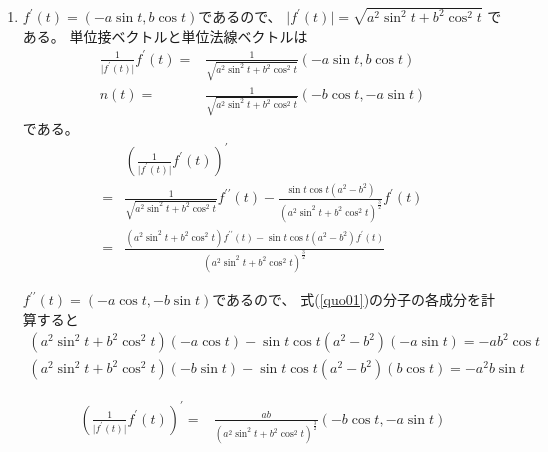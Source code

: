 \documentclass[12pt,b5paper]{ltjsarticle}
\begin{document}
\begin{enumerate}
\begin{enumerate}
\end{enumerate}

\dotfill

\begin{enumerate}
 \item
      $f^{\prime}(t)=(-a\sin t, b\cos t)$であるので、
      $\lvert f^{\prime}(t) \rvert = \sqrt{a^2\sin^2 t+b^2\cos^2 t}$
      である。
      単位接ベクトルと単位法線ベクトルは
      \begin{align}
       \frac{1}{\lvert f^{\prime}(t) \rvert}f^{\prime}(t)
        =& \frac{1}{\sqrt{a^2\sin^2 t+b^2\cos^2 t}} (-a\sin t, b\cos t)\\
       n(t) =& \frac{1}{\sqrt{a^2\sin^2 t+b^2\cos^2 t}} (-b\cos t , -a\sin t)
      \end{align}
      である。
      \begin{align}
       & \left( \frac{1}{\lvert f^{\prime}(t) \rvert}f^{\prime}(t) \right)^{\prime}\\
        =& \frac{1}{\sqrt{a^2\sin^2 t+b^2\cos^2 t}}f^{\prime\prime}(t)
       - \frac{\sin t \cos t (a^2-b^2)}{(a^2\sin^2 t+b^2\cos^2 t)^{\frac{3}{2}}}f^{\prime}(t)\\
        =& \frac{(a^2\sin^2 t+b^2\cos^2 t)f^{\prime\prime}(t)
       - \sin t \cos t (a^2-b^2)f^{\prime}(t)}{(a^2\sin^2 t+b^2\cos^2 t)^{\frac{3}{2}}}\label{quo01}
      \end{align}
      
      $f^{\prime\prime}(t)=(-a\cos t, -b\sin t)$であるので、
      式(\ref{quo01})の分子の各成分を計算すると
      \begin{gather}
       (a^2\sin^2 t+b^2\cos^2 t)(-a\cos t)
       - \sin t \cos t (a^2-b^2)(-a\sin t)
       = -ab^2\cos t\\
       (a^2\sin^2 t+b^2\cos^2 t)(-b\sin t)
       - \sin t \cos t (a^2-b^2)(b\cos t)
       = -a^2b\sin t
      \end{gather}

      \begin{align}
       \left( \frac{1}{\lvert f^{\prime}(t) \rvert}f^{\prime}(t) \right)^{\prime}
        =& \frac{ab}{(a^2\sin^2 t+b^2\cos^2 t)^{\frac{3}{2}}}(-b\cos t,-a\sin t)
      \end{align}




\end{enumerate}
\end{enumerate}
\end{document}
